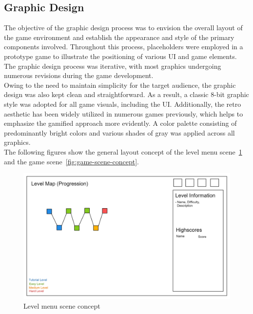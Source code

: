 \subsection{Graphic Design}\label{subsec:graphic-design}
The objective of the graphic design process was to envision the overall layout of the game environment and establish the
appearance and style of the primary components involved.
Throughout this process, placeholders were employed in a prototype game to illustrate the positioning of various UI and game elements.
The graphic design process was iterative, with most graphics undergoing numerous revisions during the game development.
\\
Owing to the need to maintain simplicity for the target audience, the graphic design was also kept clean and straightforward.
As a result, a classic 8-bit graphic style was adopted for all game visuals, including the UI. Additionally,
the retro aesthetic has been widely utilized in numerous games previously, which helps to emphasize the gamified approach more evidently.
A color palette consisting of predominantly bright colors and various shades of gray was applied across all graphics.
\\
The following figures show the general layout concept of the level
menu scene~\ref{fig:level-menu-scene-concept} and the game scene~\ref{fig:game-scene-concept}.
\begin{figure}
    \includegraphics[width=\textwidth]{Pictures/res/concept/level-menu-scene-concept}
    \caption{Level menu scene concept}
    \label{fig:level-menu-scene-concept}
\end{figure}
